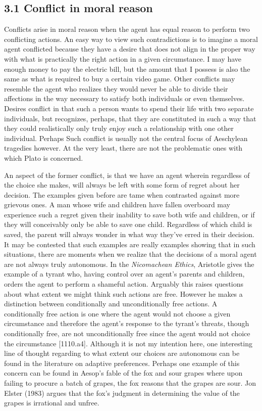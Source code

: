 \documentclass[12pt]{book}
\theoremstyle{definition}
\theoremstyle{remark}
\begin{document}
\subsection*{3.1 Conflict in moral reason}\label{conflict-in-moral-reason}

Conflicts arise in moral reason when the agent has equal reason to perform two conflicting actions. An easy way to view such contradictions is to imagine a moral agent conflicted because they have a desire that does not align in the proper way with what is practically the right action in a given circumstance. I may have enough money to pay the electric bill, but the amount that I possess is also the same as what is required to buy a certain video game. Other conflicts may resemble the agent who realizes they would never be able to divide their affections in the way necessary to satisfy both individuals or even themselves. Desires conflict in that such a person wants to spend their life with two separate individuals, but recognizes, perhaps, that they are constituted in such a way that they could realistically only truly enjoy such a relationship with one other individual. Perhaps Such conflict is usually not the central focus of Aeschylean tragedies however. At the very least, there are not the problematic ones with which Plato is concerned.

An aspect of the former conflict, is that we have an agent wherein regardless of the choice she makes, will always be left with some form of regret about her decision. The examples given before are tame when contrasted against more grievous ones. A man whose wife and children have fallen overboard may experience such a regret given their inability to save both wife and children, or if they will conceivably only be able to save one child. Regardless of which child is saved, the parent will always wonder in what way they've erred in their decision. It may be contested that such examples are really examples showing that in such situations, there are moments when we realize that the decisions of a moral agent are not always truly autonomous. In the \emph{Nicomachean Ethics}, Aristotle gives the example of a tyrant who, having control over an agent's parents and children, orders the agent to perform a shameful action. Arguably this raises questions about what extent we might think such actions are free. However he makes a distinction between conditionally and unconditionally free actions. A conditionally free action is one where the agent would not choose a given circumstance and therefore the agent's response to the tyrant's threats, though conditionally free, are not unconditionally free since the agent would not choice the circumstance {[}1110.a4{]}. Although it is not my intention here, one interesting line of thought regarding to what extent our choices are autonomous can be found in the literature on adaptive preferences. Perhaps one example of this concern can be found in Aesop's fable of the fox and sour grapes where upon failing to procure a batch of grapes, the fox reasons that the grapes are sour. Jon Elster (1983) argues that the fox's judgment in determining the value of the grapes is irrational and unfree.
\end{document}
